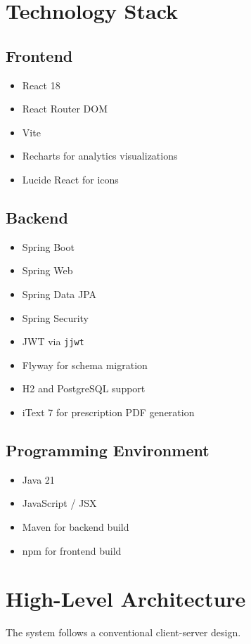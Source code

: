 \documentclass[12pt,a4paper]{article}
\begin{document}
\section{Technology Stack}
\subsection{Frontend}
\begin{itemize}[leftmargin=*]
  \item React 18
  \item React Router DOM
  \item Vite
  \item Recharts for analytics visualizations
  \item Lucide React for icons
\end{itemize}

\subsection{Backend}
\begin{itemize}[leftmargin=*]
  \item Spring Boot
  \item Spring Web
  \item Spring Data JPA
  \item Spring Security
  \item JWT via \texttt{jjwt}
  \item Flyway for schema migration
  \item H2 and PostgreSQL support
  \item iText 7 for prescription PDF generation
\end{itemize}

\subsection{Programming Environment}
\begin{itemize}[leftmargin=*]
  \item Java 21
  \item JavaScript / JSX
  \item Maven for backend build
  \item npm for frontend build
\end{itemize}

\section{High-Level Architecture}
The system follows a conventional client-server design.
\end{document}

